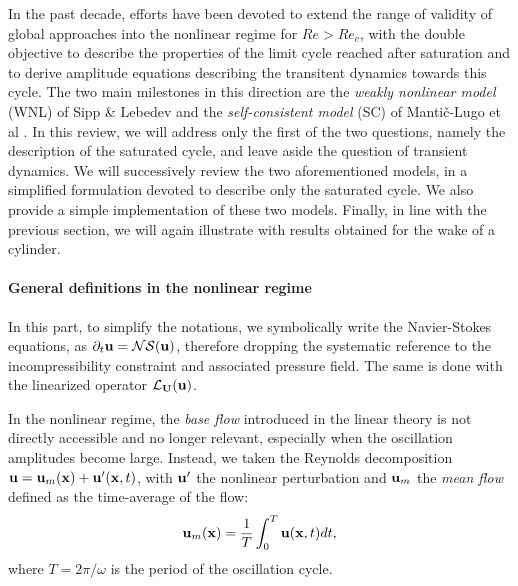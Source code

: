 \documentclass[twocolumn,10pt]{asme2ej}
\newcommand{\be}[1]{ \begin{equation} \label{#1}}
\newcommand{\ee}{\end{equation}}
\begin{document}
In the past decade, efforts have been devoted to extend the range of validity of global approaches into the nonlinear regime for $Re>Re_c$, with the double objective to describe the properties of the limit cycle reached after saturation and to derive amplitude equations describing the transitent dynamics towards this cycle. The two main milestones in this direction {\color{red} are} the {\em weakly nonlinear model}  (WNL) of Sipp \& Lebedev \cite{SippLebedev} and the {\em self-consistent model} (SC) of Manti\v{c}-Lugo et al \cite{MLugo2014}.
 {\color{blue} In this review, we will address only the first of the two questions, namely {\color{red} the} description of the saturated cycle, and leave aside the question of transient dynamics. We will successively review the two aforementioned models, in a simplified formulation devoted to describe only the saturated cycle. We also provide a simple implementation of these two models. Finally, in line with the previous section, we will again illustrate with results obtained for the wake of a cylinder.
 }
 
 

\paragraph{General definitions in the nonlinear r{\color{red}e}gime}
 
In this part, to simplify the notations, we symbolically write the Navier-Stokes equations, as {\color{red}$\partial_t {\bf u} = {\cal NS} ({\bf u})$}, therefore dropping the systematic reference to the incompressibility constraint and associated pressure field. {\color{red} The same is done with the linearized operator ${\cal L}_{{\bf U}}( {\bf u})$.}

In the nonlinear r{\color{red}e}gime, the {\em base flow} introduced in the linear theory is not directly accessible and no longer relevant, especially when the oscillation amplitudes become large. 
Instead, {\color{red} we taken the Reynolds decomposition ${\bf u}={\bf u}_m({\bf x})+{\bf u}'({\bf x},t)$, with ${\bf u}'$ the nonlinear perturbation and ${\bf u}_m$ the {\em mean flow} defined as the time-average  of the flow:}
\be{defumean}
{\bf u}_m({\bf x})  = \frac{1}{T} \int_0^{T}  {\bf u}({\bf x},t)  dt,
\ee
where $T = 2\pi/\omega$  is the period of the oscillation cycle.
\end{document}
